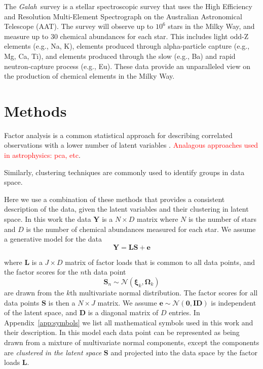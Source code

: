 \documentclass[twocolumn]{aastex61}
\newcommand{\project}[1]{\textsl{#1}}
\newcommand{\Galah}{\project{Galah}}
\newcommand{\todo}[1]{\textcolor{red}{#1}}
\newcommand{\vect}[1]{\boldsymbol{\mathbf{#1}}}
\renewcommand{\vec}[1]{\vect{#1}}
\newcommand{\data}{\textbf{Y}}
\newcommand{\vecdata}{\vec\data}
\newcommand{\eye}{\textbf{I}}
\newcommand{\factorloads}{\textbf{L}}
\newcommand{\factorscores}{\textbf{S}}
\newcommand{\specificvariance}{\vec{D}}
\newcommand{\NumData}{N}
\newcommand{\NumDimensions}{D}
\newcommand{\numdata}{n}
\newcommand{\NumLatentFactors}{J}
\newcommand{\numcomponents}{k}
\begin{document}
The \Galah\ survey \citep{DaSilva:2015} is a stellar spectroscopic survey 
that uses the High Efficiency and Resolution Multi-Element 
Spectrograph \citep[HERMES][]{Sheinis:2016} on the Australian Astronomical Telescope (AAT).
The survey will observe up to $10^6$ stars in the Milky Way, and
measure up to 30 chemical abundances for each star. This includes
light odd-Z elements (e.g., Na, K), elements produced through
alpha-particle capture (e.g., Mg, Ca, Ti), and elements produced
through the slow (e.g., Ba) and rapid neutron-capture process
(e.g., Eu). These data provide an unparalleled view on the production
of chemical elements in the Milky Way.

\section{Methods} \label{sec:methods}


Factor analysis is a common statistical approach for describing correlated 
observations with a lower number of latent variables \citep{factor-analysis}.
\todo{Analagous approaches used in astrophysics: pca, etc}.

Similarly, clustering techniques are commonly used to identify groups in 
data space. 

Here we use a combination of these methods that provides a
consistent description of the data, given the latent variables and their 
clustering in latent space. In this work the data $\vecdata$ is a 
$\NumData \times \NumDimensions$ matrix where $\NumData$ is the number of 
stars and $\NumDimensions$ is the number of chemical abundances measured 
for each star. We assume a
generative model for the data 
\begin{equation}
	\vecdata = \factorloads\factorscores + \vec{e}
	\label{eq:generative-model}
\end{equation}

\noindent{}where $\factorloads$ is a $\NumLatentFactors \times \NumDimensions$ matrix of factor
loads that is common to all data points, and the factor scores for
the $\numdata$th data point
\begin{equation}
	\factorscores_\numdata \sim \mathcal{N}(\vec\xi_\numcomponents, \vec\Omega_\numcomponents)
\end{equation}
\noindent{}are drawn from the $\numcomponents$th multivariate  normal distribution.
The factor scores for all data points $\factorscores$ is then a 
$\NumData \times \NumLatentFactors$ matrix.
 We assume $\vec{e} \sim \mathcal{N}\left(\vec{0}, \eye\specificvariance\right)$
is independent of the latent space, and $\specificvariance$ is a
diagonal matrix of $\NumDimensions$ entries. In Appendix~\ref{app:symbols}
we list all mathematical symbols used in this work and their description.
In this model each data point can be represented as being drawn
from a mixture of multivariate normal components, except the components
are \emph{clustered in the latent space} $\factorscores$ and projected
into the data space by the factor loads $\factorloads$. 
\end{document}
